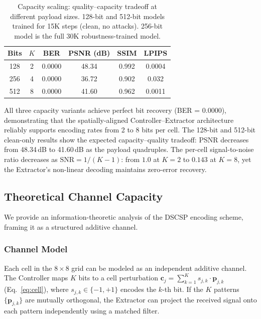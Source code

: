 \documentclass[conference]{IEEEtran}
\begin{document}
\begin{table}[t]
\centering
\caption{Capacity scaling: quality--capacity tradeoff at different payload sizes. 128-bit and 512-bit models trained for 15K steps (clean, no attacks). 256-bit model is the full 30K robustness-trained model.}
\label{tab:scaling}
\small
\begin{tabular}{@{}cccccc@{}}
\toprule
\textbf{Bits} & \textbf{$K$} & \textbf{BER} & \textbf{PSNR (dB)} & \textbf{SSIM} & \textbf{LPIPS} \\
\midrule
128  & 2 & 0.0000 & 48.34 & 0.992 & 0.0004 \\
256  & 4 & 0.0000 & 36.72 & 0.902 & 0.032 \\
512  & 8 & 0.0000 & 41.60 & 0.962 & 0.0011 \\
\bottomrule
\end{tabular}
\end{table}

All three capacity variants achieve perfect bit recovery (BER = 0.0000), demonstrating that the spatially-aligned Controller--Extractor architecture reliably supports encoding rates from 2 to 8 bits per cell.
The 128-bit and 512-bit clean-only results show the expected capacity--quality tradeoff: PSNR decreases from 48.34\,dB to 41.60\,dB as the payload quadruples.
The per-cell signal-to-noise ratio decreases as $\text{SNR} = 1/(K-1)$: from $1.0$ at $K=2$ to $0.143$ at $K=8$, yet the Extractor's non-linear decoding maintains zero-error recovery.


\subsection{Theoretical Channel Capacity}
\label{sec:capacity}

We provide an information-theoretic analysis of the DSCSP encoding scheme, framing it as a structured additive channel.

\subsubsection{Channel Model}
Each cell in the $8 \times 8$ grid can be modeled as an independent additive channel.
The Controller maps $K$ bits to a cell perturbation $\mathbf{c}_j = \sum_{k=1}^{K} s_{j,k} \cdot \mathbf{p}_{j,k}$ (Eq.~\ref{eq:cell}), where $s_{j,k} \in \{-1, +1\}$ encodes the $k$-th bit.
If the $K$ patterns $\{\mathbf{p}_{j,k}\}$ are mutually orthogonal, the Extractor can project the received signal onto each pattern independently using a matched filter.
\end{document}
